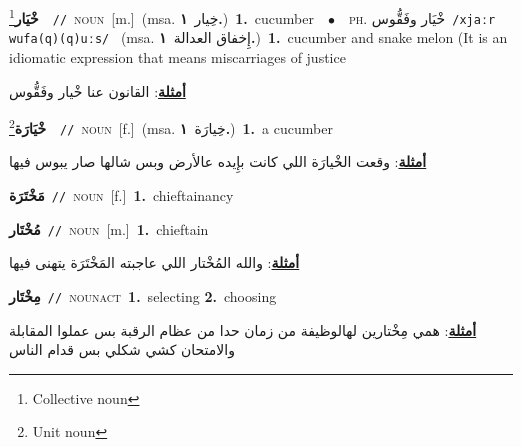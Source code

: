 \documentclass[10pt,a4paper,twoside]{article} %
\begin{document}
\begin{multicols}{2}
{\setlength\topsep{0pt}\textbf{\foreignlanguage{arabic}{خْيَار}}\footnote{Collective noun}\ \ {\color{gray}\texttt{//}\color{black}}\ \textsc{noun}\ [m.]\ \color{gray}(msa. \foreignlanguage{arabic}{خِيار}~\foreignlanguage{arabic}{\textbf{١.}})\color{black}\ \textbf{1.}~cucumber\ \ $\bullet$\ \ \textsc{ph.} \color{gray} \foreignlanguage{arabic}{خْيَار وفَقُّوس}\color{black}\ {\color{gray}\texttt{/{\sffamily xjaːr wufa(q)(q)uːs}/}\color{black}}\ \color{gray} (msa. \foreignlanguage{arabic}{إِخفاق العدالة}~\foreignlanguage{arabic}{\textbf{١.}})\color{black}\ \textbf{1.}~cucumber and snake melon (It is an idiomatic expression that means miscarriages of justice\  \begin{flushright}\color{gray}\foreignlanguage{arabic}{\textbf{\underline{\foreignlanguage{arabic}{أمثلة}}}: القانون عنا خْيار وفَقُّوس}\end{flushright}\color{black}} \vspace{2mm}

{\setlength\topsep{0pt}\textbf{\foreignlanguage{arabic}{خْيَارَة}}\footnote{Unit noun}\ \ {\color{gray}\texttt{//}\color{black}}\ \textsc{noun}\ [f.]\ \color{gray}(msa. \foreignlanguage{arabic}{خِيارَة}~\foreignlanguage{arabic}{\textbf{١.}})\color{black}\ \textbf{1.}~a cucumber\  \begin{flushright}\color{gray}\foreignlanguage{arabic}{\textbf{\underline{\foreignlanguage{arabic}{أمثلة}}}: وقعت الخْيارَة اللي كانت بإِيده عالأرض وبس شالها صار يبوس فيها}\end{flushright}\color{black}} \vspace{2mm}

{\setlength\topsep{0pt}\textbf{\foreignlanguage{arabic}{مَخْتَرَة}}\ {\color{gray}\texttt{//}\color{black}}\ \textsc{noun}\ [f.]\ \textbf{1.}~chieftainancy\ } \vspace{2mm}

{\setlength\topsep{0pt}\textbf{\foreignlanguage{arabic}{مُخْتَار}}\ {\color{gray}\texttt{//}\color{black}}\ \textsc{noun}\ [m.]\ \textbf{1.}~chieftain\  \begin{flushright}\color{gray}\foreignlanguage{arabic}{\textbf{\underline{\foreignlanguage{arabic}{أمثلة}}}: والله المُخْتار اللي عاجبته المَخْتَرَة يتهنى فيها}\end{flushright}\color{black}} \vspace{2mm}

{\setlength\topsep{0pt}\textbf{\foreignlanguage{arabic}{مِخْتَار}}\ {\color{gray}\texttt{//}\color{black}}\ \textsc{noun\textunderscore act}\ \textbf{1.}~selecting  \textbf{2.}~choosing\  \begin{flushright}\color{gray}\foreignlanguage{arabic}{\textbf{\underline{\foreignlanguage{arabic}{أمثلة}}}: همي مِخْتارين لهالوظيفة من زمان حدا من عظام الرقبة بس عملوا المقابلة والامتحان كشي شكلي بس قدام الناس}\end{flushright}\color{black}} \vspace{2mm}


\end{multicols}
\end{document}
